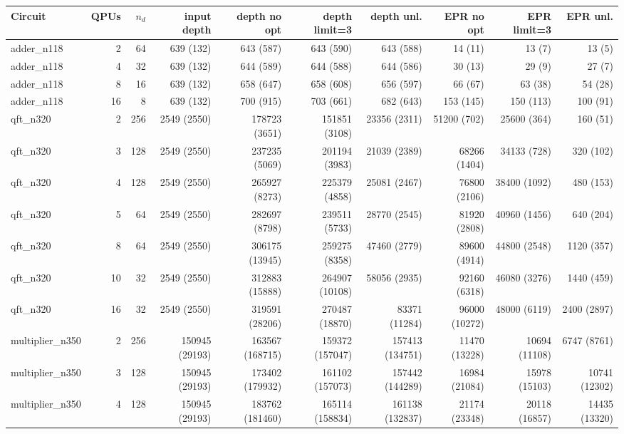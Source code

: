 \begin{table}[ht]
\centering
\begin{tabular}{lrrrrrrrrr}
\hline
Circuit & QPUs & $n_d$ & input depth & depth no opt & depth limit=3 & depth unl. & EPR no opt & EPR limit=3 & EPR unl. \\
\hline
adder\_n118 & 2 & 64 & 639 (132) & 643 (587) & 643 (590) & 643 (588) & 14 (11) & 13 (7) & 13 (5) \\
adder\_n118 & 4 & 32 & 639 (132) & 644 (589) & 644 (588) & 644 (586) & 30 (13) & 29 (9) & 27 (7) \\
adder\_n118 & 8 & 16 & 639 (132) & 658 (647) & 658 (608) & 656 (597) & 66 (67) & 63 (38) & 54 (28) \\
adder\_n118 & 16 & 8 & 639 (132) & 700 (915) & 703 (661) & 682 (643) & 153 (145) & 150 (113) & 100 (91) \\
qft\_n320 & 2 & 256 & 2549 (2550) & 178723 (3651) & 151851 (3108) & 23356 (2311) & 51200 (702) & 25600 (364) & 160 (51) \\
qft\_n320 & 3 & 128 & 2549 (2550) & 237235 (5069) & 201194 (3983) & 21039 (2389) & 68266 (1404) & 34133 (728) & 320 (102) \\
qft\_n320 & 4 & 128 & 2549 (2550) & 265927 (8273) & 225379 (4858) & 25081 (2467) & 76800 (2106) & 38400 (1092) & 480 (153) \\
qft\_n320 & 5 & 64 & 2549 (2550) & 282697 (8798) & 239511 (5733) & 28770 (2545) & 81920 (2808) & 40960 (1456) & 640 (204) \\
qft\_n320 & 8 & 64 & 2549 (2550) & 306175 (13945) & 259275 (8358) & 47460 (2779) & 89600 (4914) & 44800 (2548) & 1120 (357) \\
qft\_n320 & 10 & 32 & 2549 (2550) & 312883 (15888) & 264907 (10108) & 58056 (2935) & 92160 (6318) & 46080 (3276) & 1440 (459) \\
qft\_n320 & 16 & 32 & 2549 (2550) & 319591 (28206) & 270487 (18870) & 83371 (11284) & 96000 (10272) & 48000 (6119) & 2400 (2897) \\
multiplier\_n350 & 2 & 256 & 150945 (29193) & 163567 (168715) & 159372 (157047) & 157413 (134751) & 11470 (13228) & 10694 (11108) & 6747 (8761) \\
multiplier\_n350 & 3 & 128 & 150945 (29193) & 173402 (179932) & 161102 (157073) & 157442 (144289) & 16984 (21084) & 15978 (15103) & 10741 (12302) \\
multiplier\_n350 & 4 & 128 & 150945 (29193) & 183762 (181460) & 165114 (158834) & 161138 (132837) & 21174 (23348) & 20118 (16857) & 14435 (13320) \\

\end{tabular}
\end{table}
